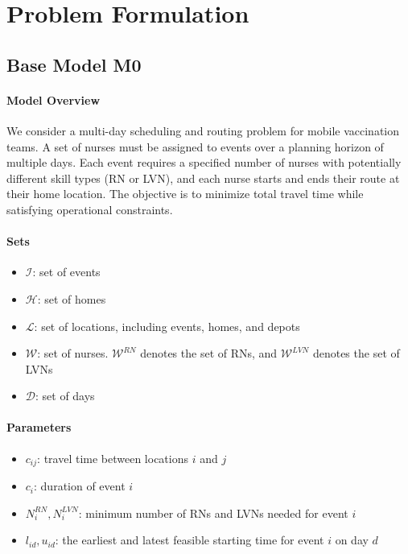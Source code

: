 \section{Problem Formulation}

\subsection{Base Model M0}

\paragraph{Model Overview}
We consider a multi-day scheduling and routing problem for mobile vaccination teams. A set of nurses must be assigned to events over a planning horizon of multiple days. Each event requires a specified number of nurses with potentially different skill types (RN or LVN), and each nurse starts and ends their route at their home location. The objective is to minimize total travel time while satisfying operational constraints. 

\paragraph{Sets}
\begin{itemize}
    \item $\mathcal{I}$: set of events
    \item $\mathcal{H}$: set of homes
    \item $\mathcal{L}$: set of locations, including events, homes, and depots
    \item $\mathcal{W}$: set of nurses. $\mathcal{W}^{RN}$ denotes the set of RNs, and $\mathcal{W}^{LVN}$ denotes the set of LVNs
    \item $\mathcal{D}$: set of days
\end{itemize}

\paragraph{Parameters}
\begin{itemize}
    \item $c_{ij}$: travel time between locations $i$ and $j$
    \item $c_i$: duration of event $i$
    \item $N_i^{RN}, N_i^{LVN}$: minimum number of RNs and LVNs needed for event $i$
    \item $l_{id}, u_{id}$: the earliest and latest feasible starting time for event $i$ on day $d$
\end{itemize}


